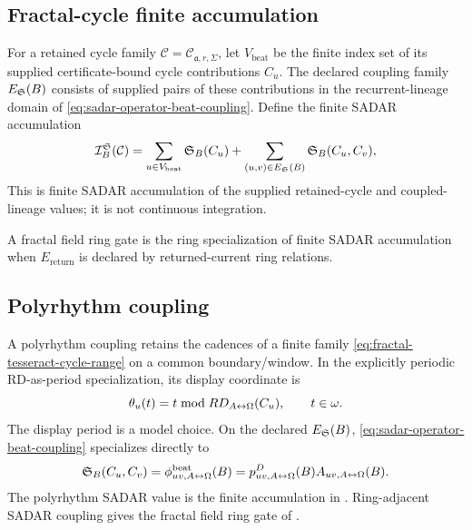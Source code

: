 \subsection{Fractal-cycle finite accumulation}
\label{subsec:fractal-cycle-finite-accumulation}
For a retained cycle family \(\mathcal C=\mathcal C_{\mathfrak a,r,\Sigma}\),
let \(V_{\mathrm{beat}}\) be the finite index set of its supplied certificate-bound cycle
contributions \(C_u\). The declared coupling family \(E_{\mathfrak S}(B)\)
consists of supplied pairs of these contributions in the recurrent-lineage
domain of \eqref{eq:sadar-operator-beat-coupling}. Define the finite SADAR
accumulation
\begin{equation}
\mathcal I^{\mathfrak S}_{B}(\mathcal C)
=
\sum_{u\in V_{\mathrm{beat}}}
\mathfrak S_B(C_u)
+
\sum_{(u,v)\in E_{\mathfrak S}(B)}
\mathfrak S_B(C_u,C_v),
\label{eq:fractal-cycle-finite-accumulation}
\end{equation}
This is finite SADAR accumulation of the supplied retained-cycle and
coupled-lineage values; it is not continuous integration.

A fractal field ring gate is the ring specialization of finite SADAR accumulation when \(E_{\mathrm{return}}\) is declared by returned-current ring relations.


\subsection{Polyrhythm coupling}
\label{subsec:polyrhythm-coupling}
A polyrhythm coupling retains the cadences of a finite family
\eqref{eq:fractal-tesseract-cycle-range} on a common boundary/window.
In the explicitly periodic RD-as-period specialization, its display coordinate is
\begin{equation}
\theta_u(t)=t\bmod RD_{A{\leftrightarrow}\Omega}(C_u),
\qquad t\in\omega.
\label{eq:polyrhythm-phase-coordinate}
\end{equation}
The display period is a model choice. On the declared \(E_{\mathfrak S}(B)\),
\eqref{eq:sadar-operator-beat-coupling} specializes directly to
\begin{equation}
\mathfrak S_B(C_u,C_v)
=
\phi^{\mathrm{beat}}_{uv,A{\leftrightarrow}\Omega}(B)
=
p^D_{uv,A{\leftrightarrow}\Omega}(B)A_{uv,A{\leftrightarrow}\Omega}(B).
\label{eq:polyrhythm-sadar-coupling}
\end{equation}
The polyrhythm SADAR value is the finite accumulation in . Ring-adjacent SADAR coupling gives the fractal field ring gate of .

